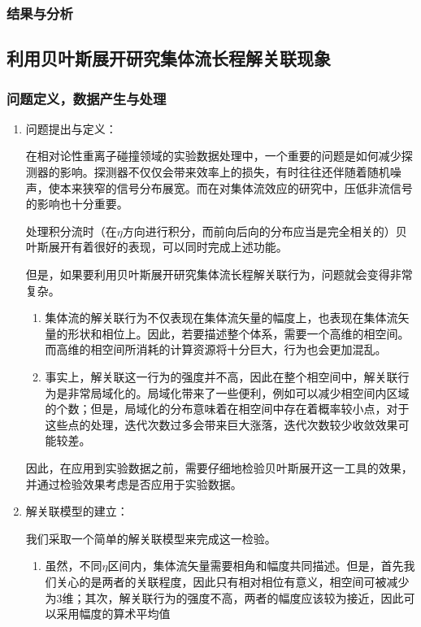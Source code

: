 \documentclass[aps,pre,12pt,preprint,onecolumn,showpacs,showkeys]{revtex4-1}
\begin{document}
\subsubsection{结果与分析}
   
\subsection{利用贝叶斯展开研究集体流长程解关联现象}
\subsubsection{问题定义，数据产生与处理}
\begin{enumerate}
    \item 问题提出与定义：\par
    在相对论性重离子碰撞领域的实验数据处理中，一个重要的问题是如何减少探测器的影响。探测器不仅仅会带来效率上的损失，有时往往还伴随着随机噪声，使本来狭窄的信号分布展宽。而在对集体流效应的研究中，压低非流信号的影响也十分重要。
    \par
    处理积分流时（在$\eta$方向进行积分，而前向后向的分布应当是完全相关的）贝叶斯展开有着很好的表现，可以同时完成上述功能。\par
    但是，如果要利用贝叶斯展开研究集体流长程解关联行为，问题就会变得非常复杂。
    \begin{enumerate}
        \item 集体流的解关联行为不仅表现在集体流矢量的幅度上，也表现在集体流矢量的形状和相位上。因此，若要描述整个体系，需要一个高维的相空间。而高维的相空间所消耗的计算资源将十分巨大，行为也会更加混乱。
        \item 事实上，解关联这一行为的强度并不高，因此在整个相空间中，解关联行为是非常局域化的。局域化带来了一些便利，例如可以减少相空间内区域的个数；但是，局域化的分布意味着在相空间中存在着概率较小点，对于这些点的处理，迭代次数过多会带来巨大涨落，迭代次数较少收敛效果可能较差。
    \end{enumerate}
    因此，在应用到实验数据之前，需要仔细地检验贝叶斯展开这一工具的效果，并通过检验效果考虑是否应用于实验数据。
    \item 解关联模型的建立：\par
    我们采取一个简单的解关联模型来完成这一检验。\par
    \begin{enumerate}
        \item 虽然，不同$\eta$区间内，集体流矢量需要相角和幅度共同描述。但是，首先我们关心的是两者的关联程度，因此只有相对相位有意义，相空间可被减少为3维；其次，解关联行为的强度不高，两者的幅度应该较为接近，因此可以采用幅度的算术平均值

\end{enumerate}
\end{enumerate}
\end{document}
